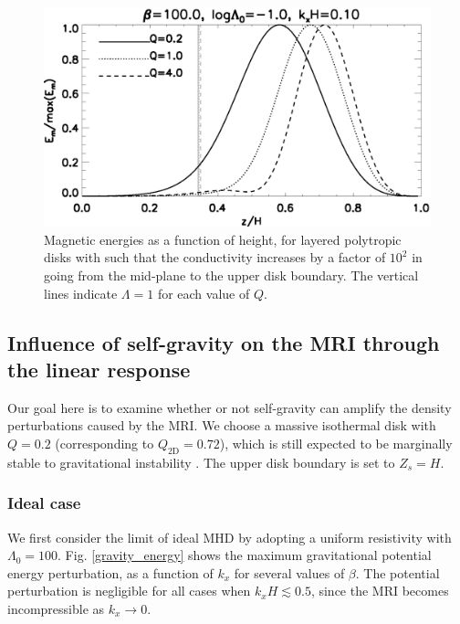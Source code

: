 \begin{figure}
  \includegraphics[width=\linewidth]{figures/compare_results_poly_layer_amp100}
  \caption{Magnetic energies as a function of height, for layered polytropic disks with
    such that the conductivity increases by a 
    factor of $10^2$ in going from the mid-plane to the upper disk
    boundary. The vertical lines indicate $\Lambda=1$ for each value
    of $Q$.
    \label{poly_layer}}
\end{figure}


\subsection{Influence of self-gravity on the MRI through the linear
  response}  
Our goal here is to examine whether or not self-gravity can amplify
the density perturbations caused by the MRI. We choose a massive 
isothermal disk with $Q=0.2$ (corresponding to $Q_\mathrm{2D}=0.72$),
which is still expected to be marginally 
stable to gravitational instability \citep[][who find
a critical value of  $Q\simeq 0.2$]{mamat10}.   
The upper disk boundary is set to $Z_s=H$. 


\subsubsection{Ideal case}
We first consider the limit of ideal MHD by adopting a uniform
resistivity with $\Lambda_0=100$. %
Fig. \ref{gravity_energy} shows the maximum gravitational potential
energy perturbation, as a function of $k_x$ for several values of
$\beta$. The potential perturbation is negligible for all cases when 
$k_xH\lesssim 0.5$, since the MRI becomes incompressible as $k_x\to
0$. 

